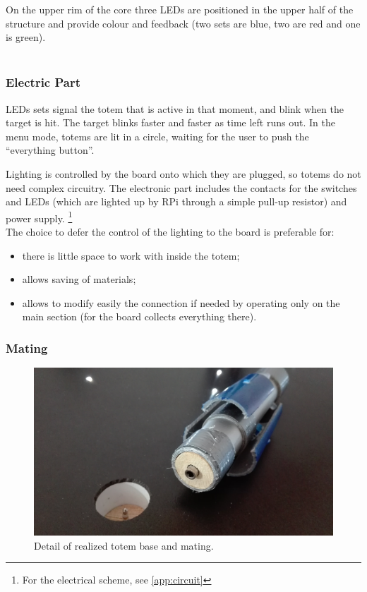 \documentclass[a4paper,twoside]{book}
\begin{document}
On the upper rim of the core three LEDs are positioned in the upper half of the structure and provide colour and feedback (two sets are blue, two are red and one is green).
\\
\\
\subsubsection{Electric Part}
LEDs sets signal the totem that is active in that moment, and blink when the target is hit. The target blinks faster and faster as time left runs out. In the menu mode, totems are lit in a circle, waiting for the user to push the \textquotedblleft everything button\textquotedblright.

Lighting is controlled by the board onto which they are plugged, so totems do not need complex circuitry. The electronic part includes the contacts for the switches and LEDs (which are lighted up by RPi through a simple pull-up resistor) and power supply.
\footnote{For the electrical scheme, see \autoref{app:circuit}}
\\
The choice to defer the control of the lighting to the board is preferable for:
\begin{itemize}
\item there is little space to work with inside the totem;
\item allows saving of materials;
\item allows to modify easily the connection if needed by operating only on the main section (for the board collects everything there).
\end{itemize}

\subsubsection{Mating}

\begin{figure}[h]
\includegraphics[width=\linewidth]{img/IMG_20160616_114517} 
\caption{Detail of realized totem base and mating.}
\end{figure}
\end{document}
